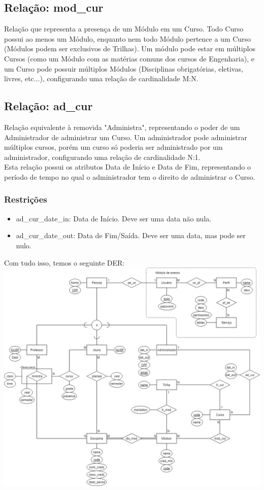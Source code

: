 \documentclass{article}
\begin{document}
    \subsection{Relação: mod\_cur}
        \quad Relação que representa a presença de um Módulo em um Curso. Todo Curso possui ao menos um Módulo, enquanto nem todo Módulo pertence a um Curso (Módulos podem ser exclusivos de Trilhas).
        \quad Um módulo pode estar em múltiplos Cursos (como um Módulo com as matérias comuns dos cursos de Engenharia), e um Curso pode possuir múltiplos Módulos (Disciplinas obrigatórias, eletivas, livres, etc...), configurando uma relação de cardinalidade M:N.
    
    \subsection{Relação: ad\_cur}
        \quad Relação equivalente à removida "Administra", representando o poder de um Administrador de administrar um Curso. Um administrador pode administrar múltiplos cursos, porém um curso só poderia ser administrado por um administrador, configurando uma relação de cardinalidade N:1. \\
        \quad Esta relação possui os atributos Data de Início e Data de Fim, representando o período de tempo no qual o administrador tem o direito de administrar o Curso.
        \subsubsection{Restrições}
            \begin{itemize}
                \item ad\_cur\_date\_in: Data de Início. Deve ser uma data não nula.
                \item ad\_cur\_date\_out: Data de Fim/Saída. Deve ser uma data, mas pode ser nulo.
          \end{itemize}
          
    Com tudo isso, temos o seguinte DER: \\
    \includegraphics[width=\textwidth]{DER-Completo.png}
    
\end{document}
